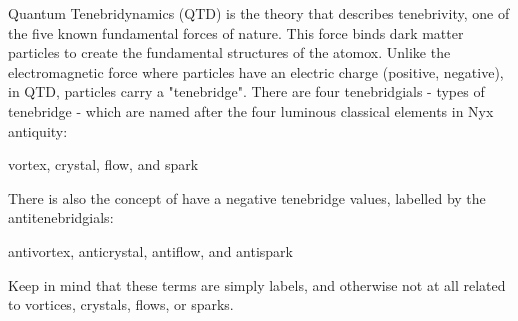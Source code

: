Quantum Tenebridynamics (QTD) is the theory that describes tenebrivity, one of
the five known fundamental forces of nature. This force binds dark matter
particles to create the fundamental structures of the atomox. Unlike the
electromagnetic force where particles have an electric charge (positive,
negative), in QTD, particles carry a "tenebridge". There are four tenebridgials
- types of tenebridge - which are named after the four luminous classical
elements in Nyx antiquity:
\begin{center}vortex, crystal, flow, and spark\end{center}
There is also the concept of have a negative tenebridge values, labelled by the antitenebridgials:
\begin{center}antivortex, anticrystal, antiflow, and antispark\end{center}
Keep in mind that these terms are simply labels, and otherwise not at all related to vortices, crystals, flows, or sparks.

